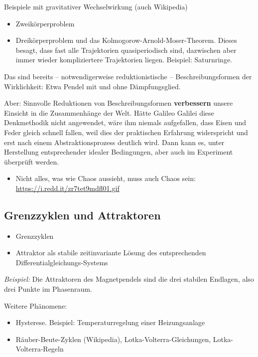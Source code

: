 \documentclass[11pt,a4paper]{article}
\begin{document}
Beispiele mit gravitativer Wechselwirkung (auch Wikipedia)
\begin{itemize}[noitemsep]
\item Zweikörperproblem
\item Dreikörperproblem und das Kolmogorow-Arnold-Moser-Theorem. Dieses
  besagt, dass fast alle Trajektorien quasiperiodisch sind, dazwischen aber
  immer wieder kompliziertere Trajektorien liegen. Beispiel: Saturnringe. 
\end{itemize}
Das sind bereits -- notwendigerweise reduktionistische -- Beschreibungsformen
der Wirklichkeit: Etwa Pendel mit und ohne Dämpfungsglied.

Aber: Sinnvolle Reduktionen von Beschreibungsformen \textbf{verbessern} unsere
Einsicht in die Zusammenhänge der Welt. Hätte Galileo Galilei diese
Denkmethodik nicht angewendet, wäre ihm niemals aufgefallen, dass Eisen und
Feder gleich schnell fallen, weil dies der praktischen Erfahrung widerspricht
und erst nach einem Abstraktionsprozess deutlich wird. Dann kann es, unter
Herstellung entsprechender idealer Bedingungen, aber auch im Experiment
überprüft werden. 

\begin{itemize}[noitemsep]
\item Nicht alles, was wie Chaos aussieht, muss auch Chaos sein:\\
  \url{https://i.redd.it/zr7tet9mdfl01.gif}
\end{itemize}

\subsection{Grenzzyklen und Attraktoren}

\begin{itemize}[noitemsep]
\item Grenzzyklen
\item Attraktor als stabile zeitinvariante Lösung des entsprechenden
  Differentialgleichungs-Systems 
\end{itemize}

\emph{Beispiel:} Die Attraktoren des Magnetpendels sind die drei stabilen
Endlagen, also drei Punkte im Phasenraum.

Weitere Phänomene:
\begin{itemize}[noitemsep]
\item Hysterese. Beispiel: Temperaturregelung einer Heizungsanlage
\item Räuber-Beute-Zyklen (Wikipedia), Lotka-Volterra-Gleichungen,
  Lotka-Volterra-Regeln
\end{itemize}
\end{document}

